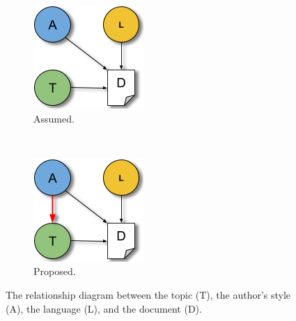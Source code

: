 \documentclass[11pt]{article}
\begin{document}
\begin{figure}[hbt!]
    \begin{subfigure}{0.24\textwidth}
    \centering
    \includegraphics[width=\textwidth]{images/relationdiagram_a}
    \caption{Assumed.\label{causal.perc}}
    \end{subfigure}~
    \begin{subfigure}{0.24\textwidth}
    \centering
    \includegraphics[width=\textwidth]{images/relationdiagram_b}
    \caption{Proposed.\label{causal.prop}}
    \end{subfigure}
  \caption{The relationship diagram between the topic (T), the author's style (A), the language (L), and the document (D).}
  \label{fig:causal}
\end{figure}
\end{document}
